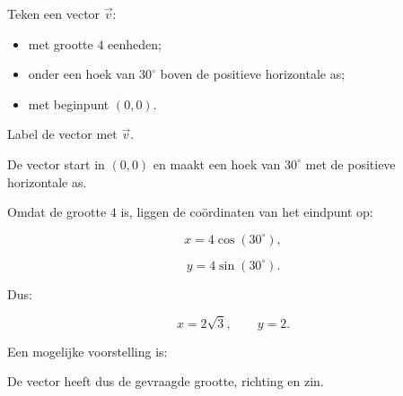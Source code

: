 \documentclass{ximera}
\begin{document}
\begin{oefening}{\oefB}

\begin{question}
Teken een vector $\vec{v}$:

\begin{itemize}
    \item met grootte $4$ eenheden;
    \item onder een hoek van $30^\circ$ boven de positieve horizontale as;
    \item met beginpunt $(0,0)$.
\end{itemize}

Label de vector met $\vec{v}$.

\begin{oplossing}
De vector start in $(0,0)$ en maakt een hoek van $30^\circ$ met de positieve
horizontale as.

Omdat de grootte $4$ is, liggen de coördinaten van het eindpunt op:

\[
x = 4\cos(30^\circ),
\]

\[
y = 4\sin(30^\circ).
\]

Dus:

\[
x = 2\sqrt{3},
\qquad
y = 2.
\]

Een mogelijke voorstelling is:

\begin{center}
\end{center}

De vector heeft dus de gevraagde grootte, richting en zin.
\end{oplossing}
\end{question}

\end{oefening}
\end{document}
